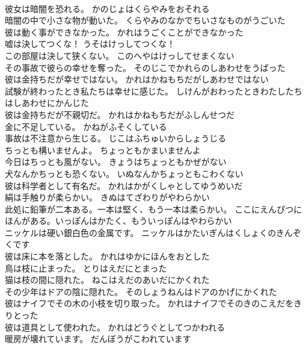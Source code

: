 \documentclass[8pt]{extreport}
\begin{document}
\begin{CJK}{UTF8}{min}
\\	彼女は暗闇を恐れる。	かのじょはくらやみをおそれる 
\\	暗闇の中で小さな物が動いた。	くらやみのなかでちいさなものがうごいた 
\\	彼は動く事ができなかった。	かれはうごくことができなかった 
\\	嘘は決してつくな！	うそはけっしてつくな！ 
\\	この部屋は決して狭くない。	このへやはけっしてせまくない 
\\	その事故で彼らの幸せを奪った。	そのじこでかれらのしあわせをうばった 
\\	彼は金持ちだが幸せではない。	かれはかねもちだがしあわせではない 
\\	試験が終わったとき私たちは幸せに感じた。	しけんがおわったときわたしたちはしあわせにかんじた 
\\	彼は金持ちだが不親切だ。	かれはかねもちだがふしんせつだ 
\\	金に不足している。	かねがふそくしている 
\\	事故は不注意から生じる。	じこはふちゅいからしょうじる 
\\	ちっとも構いませんよ。	ちょっともかまいませんよ 
\\	今日はちっとも風がない。	きょうはちょっともかぜがない 
\\	犬なんかちっとも恐くない。	いぬなんかちょっともこわくない 
\\	彼は科学者として有名だ。	かれはかがくしゃとしてゆうめいだ 
\\	絹は手触りが柔らかい。	きぬはてざわりがやわらかい 
\\	此処に鉛筆が二本ある。一本は堅く、もう一本は柔らかい。	ここにえんぴつにほんがある。いっぽんはかたく、もういっぽんはやわらかい 
\\	ニッケルは硬い銀白色の金属です。	ニッケルはかたいぎんはくしょくのきんぞくです 
\\	彼は床に本を落とした。	かれはゆかにほんをおとした 
\\	鳥は枝に止まった。	とりはえだにとまった 
\\	猫は枝の間に隠れた。	ねこはえだのあいだにかくれた 
\\	その少年はドアの陰に隠れた。	そのしょうねんはドアのかげにかくれた 
\\	彼はナイフでその木の小枝を切り取った。	かれはナイフでそのきのこえだをきりとった 
\\	彼は道具として使われた。	かれはどうぐとしてつかわれる 
\\	暖房が壊れています。	だんぼうがこわれています 

\end{CJK}
\end{document}
